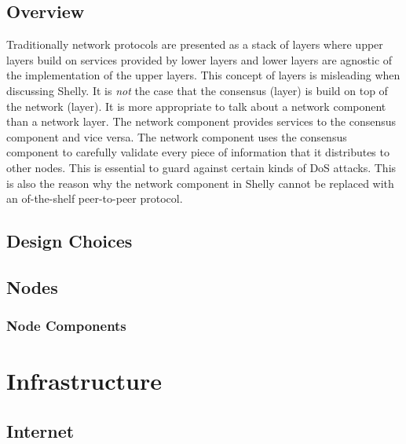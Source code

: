 \documentclass{report}
\newcommand{\wip}[1]{\color{magenta}{#1}\color{black}}
\theoremstyle{definition}{
  \newtheorem{lemma}{Lemma}[section] %
  \newtheorem{definition}[lemma]{Definition}
}
\theoremstyle{theorem}{
  \newtheorem{invariant}[lemma]{Invariant}
  \newtheorem{proofobligation}[lemma]{Proof Obligation}
}
\numberwithin{equation}{lemma}
\begin{document}
\section{Overview}

Traditionally network protocols are presented as a stack of layers where
upper layers build on services provided by lower layers and lower layers
are agnostic of the implementation of the upper layers.
This concept of layers is misleading when discussing Shelly.
It is {\em not} the case that the consensus (layer) is build on top of the network (layer).
It is more appropriate to talk about a network component than a network layer.
The network component provides services to the consensus component and vice versa.
The network component uses the consensus component to carefully validate every piece of
information that it distributes to other nodes.
This is essential to guard against certain kinds of DoS attacks.
This is also the reason why the network component in Shelly cannot be replaced
with an of-the-shelf peer-to-peer protocol.

\section{Design Choices}
\wip{
\begin{itemize}
\item Only the design choices that have been taken.
\item In this section only the big design choices.
\item Design discussions and details in the discussions section.
\end{itemize}
}

\section{Nodes}
\subsection{Node Components}

\chapter{Infrastructure}
\wip{
  WIP: Specific assumptions about the infrastructure that are relevant for the discussion.
}

\section{Internet}
\end{document}
